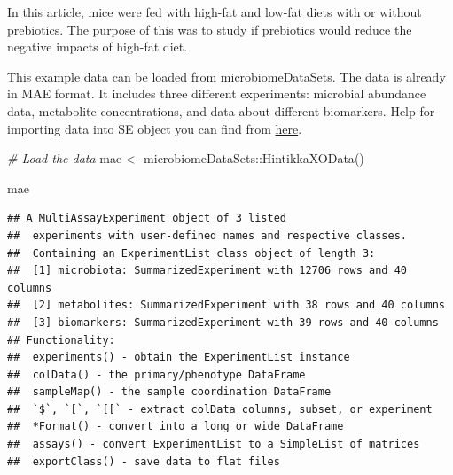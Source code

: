 \documentclass[
]{book}
\newenvironment{Shaded}{\begin{snugshade}}{\end{snugshade}}
\newcommand{\CommentTok}[1]{\textcolor[rgb]{0.56,0.35,0.01}{\textit{#1}}}
\newcommand{\FunctionTok}[1]{\textcolor[rgb]{0.00,0.00,0.00}{#1}}
\newcommand{\NormalTok}[1]{#1}
\newcommand{\OtherTok}[1]{\textcolor[rgb]{0.56,0.35,0.01}{#1}}
\newcommand{\SpecialCharTok}[1]{\textcolor[rgb]{0.00,0.00,0.00}{#1}}
\begin{document}
In this article, mice were fed with high-fat and low-fat diets with or without prebiotics.
The purpose of this was to study if prebiotics would reduce the negative impacts
of high-fat diet.

This example data can be loaded from microbiomeDataSets. The data is already in MAE
format. It includes three different experiments: microbial abundance data,
metabolite concentrations, and data about different biomarkers. Help for importing
data into SE object you can find from \href{https://microbiome.github.io/OMA/containers.html\#loading-experimental-microbiome-data}{here}.

\begin{Shaded}
\begin{Highlighting}[]
\CommentTok{\# Load the data}
\NormalTok{mae }\OtherTok{\textless{}{-}}\NormalTok{ microbiomeDataSets}\SpecialCharTok{::}\FunctionTok{HintikkaXOData}\NormalTok{()}

\NormalTok{mae}
\end{Highlighting}
\end{Shaded}

\begin{verbatim}
## A MultiAssayExperiment object of 3 listed
##  experiments with user-defined names and respective classes.
##  Containing an ExperimentList class object of length 3:
##  [1] microbiota: SummarizedExperiment with 12706 rows and 40 columns
##  [2] metabolites: SummarizedExperiment with 38 rows and 40 columns
##  [3] biomarkers: SummarizedExperiment with 39 rows and 40 columns
## Functionality:
##  experiments() - obtain the ExperimentList instance
##  colData() - the primary/phenotype DataFrame
##  sampleMap() - the sample coordination DataFrame
##  `$`, `[`, `[[` - extract colData columns, subset, or experiment
##  *Format() - convert into a long or wide DataFrame
##  assays() - convert ExperimentList to a SimpleList of matrices
##  exportClass() - save data to flat files
\end{verbatim}
\end{document}

